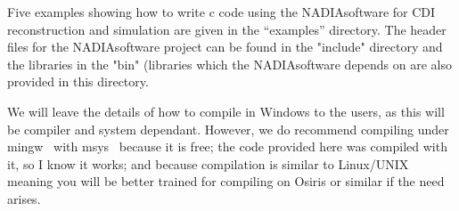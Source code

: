 \documentclass[]{nadia}
\def\name{NADIA}
\begin{document}
Five examples showing how to write c code using the \name software for
CDI reconstruction and simulation are given in the ``examples''
directory.  The header files for the \name software project can be found
in the "include" directory and the libraries in the "bin" (libraries
which the \name software depends on are also provided in this directory.

We will leave the details of how to compile in Windows to the users,
as this will be compiler and system dependant. However, we do
recommend compiling under mingw~\cite{mingw} with msys~\cite{msys} because it
is free; the code provided here was compiled with it, so I know it
works; and because compilation is similar to Linux/UNIX meaning you
will be better trained for compiling on Osiris or similar if the need
arises.





\end{document}
